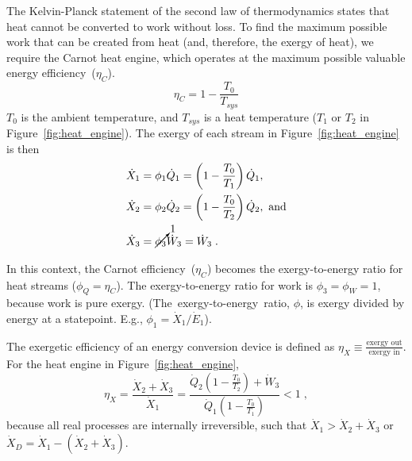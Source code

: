 \documentclass[energies,article,accept,moreauthors,pdftex]{Definitions/mdpi}\usepackage[]{graphicx}\usepackage[]{color}
\newcommand{\del}[1]{}
\newcommand{\ins}[1]{#1}
\providecommand{\DIFdelbegin}{} %
\newcommand{\DIFscaledelfig}{0.5}
\newlength{\DIFdelgraphicswidth} %
\newlength{\DIFdelgraphicsheight} %
\newcommand{\DIFdelincludegraphics}[2][]{%
\sbox{\DIFdelgraphicsbox}{\DIFOincludegraphics[#1]{#2}}%
\settoboxwidth{\DIFdelgraphicswidth}{\DIFdelgraphicsbox} %
\settoboxtotalheight{\DIFdelgraphicsheight}{\DIFdelgraphicsbox} %
\scalebox{\DIFscaledelfig}{%
\parbox[b]{\DIFdelgraphicswidth}{\usebox{\DIFdelgraphicsbox}\\[-\baselineskip] \rule{\DIFdelgraphicswidth}{0em}}\llap{\resizebox{\DIFdelgraphicswidth}{\DIFdelgraphicsheight}{%
\setlength{\unitlength}{\DIFdelgraphicswidth}%
\begin{picture}(1,1)%
\thicklines\linethickness{2pt} %
{\color[rgb]{1,0,0}\put(0,0){\framebox(1,1){}}}%
{\color[rgb]{1,0,0}\put(0,0){\line( 1,1){1}}}%
{\color[rgb]{1,0,0}\put(0,1){\line(1,-1){1}}}%
\end{picture}%
}\hspace*{3pt}}} %
} %
\DeclareRobustCommand{\DIFdelbegin}{\DIFOdelbegin \let\includegraphics\DIFdelincludegraphics} %
\begin{document}
The Kelvin-Planck statement of the second law of thermodynamics 
states that heat cannot be converted to work without loss. 
To find the maximum possible work that can be created from heat 
(and, therefore, the exergy of heat), 
we require the Carnot heat engine, which operates
at the maximum possible valuable energy efficiency~($\eta_C$).
\begin{equation} \label{eq:eta_C}
  \eta_C = 1 - \frac{T_0}{T_{sys}}
\end{equation}
%
$T_0$ is the ambient temperature, and $T_{sys}$ is a heat temperature 
($T_1$ or $T_2$ in Figure~\ref{fig:heat_engine}).
The exergy of each stream in Figure~\ref{fig:heat_engine} is then
\begin{align}
  \dot{X}_1 &= \phi_1 \dot{Q}_1 = \left(1 - \frac{T_0}{T_1} \right) \dot{Q}_1, \\
  \dot{X}_2 &= \phi_2 \dot{Q}_2 = \left(1 - \frac{T_0}{T_2} \right) \dot{Q}_2, \text{ and} \\
  \dot{X}_3 &= \cancelto{1}{\phi_3} \dot{W}_3 = \dot{W}_3 \; .
\end{align}

In this context, the Carnot efficiency~($\eta_C$) becomes the exergy-to-energy ratio
for heat streams ($\phi_Q = \eta_C$).
The exergy-to-energy ratio for work is $\phi_3 = \phi_W = 1$, 
because work is pure exergy.
\mbox{(The exergy-to-energy ratio}, $\phi$,
is exergy divided by energy at a statepoint.
E.g., $\phi_1 = \dot{X}_1 / \dot{E}_1$).

The exergetic efficiency of an energy conversion device 
is defined as $\eta_X \equiv \frac{\text{exergy out}}{\text{exergy in}}$.
For the heat engine in Figure~\ref{fig:heat_engine}, 
\begin{equation} \label{eq:exergy_efficiency}
  \eta_X = \frac{\dot{X}_2 + \dot{X}_3}{\dot{X}_1} = \frac{\dot{Q}_2 \left( 1 - \frac{T_0}{T_2} \right)  + \dot{W}_3}{\dot{Q}_1 \left( 1 - \frac{T_0}{T_1} \right) } < 1 \; ,
\end{equation}
%
\DIFdelbegin %
because all real processes are internally irreversible, such that 
$\dot{X}_1 > \dot{X}_2 + \dot{X}_3$ or 
$\dot{X}_D = \dot{X}_1 - (\dot{X}_2 + \dot{X}_3)$.
\end{document}
